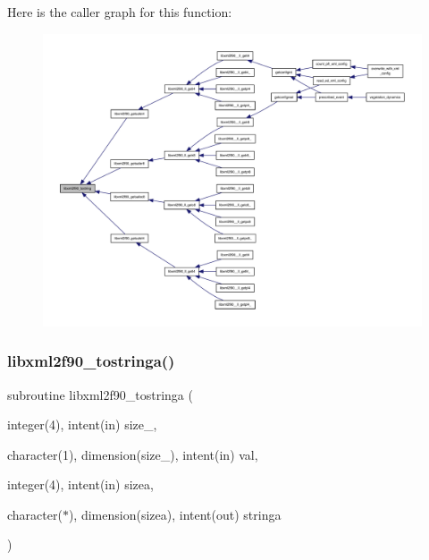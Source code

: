 Here is the caller graph for this function\+:
\nopagebreak
\begin{figure}[H]
\begin{center}
\leavevmode
\includegraphics[width=350pt]{libxml2f90_8f90__pp_8f90_ad6bcb9b8b86b4f88c534b842dc1bd9a1_icgraph}
\end{center}
\end{figure}
\mbox{\label{libxml2f90_8f90__pp_8f90_a33b51f94ad4a4b0fabdf48039bd6a849}} 
\subsubsection{\texorpdfstring{libxml2f90\+\_\+tostringa()}{libxml2f90\_tostringa()}}
{\footnotesize\ttfamily subroutine libxml2f90\+\_\+tostringa (\begin{DoxyParamCaption}\item[{integer(4), intent(in)}]{size\+\_\+,  }\item[{character(1), dimension(size\+\_\+), intent(in)}]{val,  }\item[{integer(4), intent(in)}]{sizea,  }\item[{character($\ast$), dimension(sizea), intent(out)}]{stringa }\end{DoxyParamCaption})}

